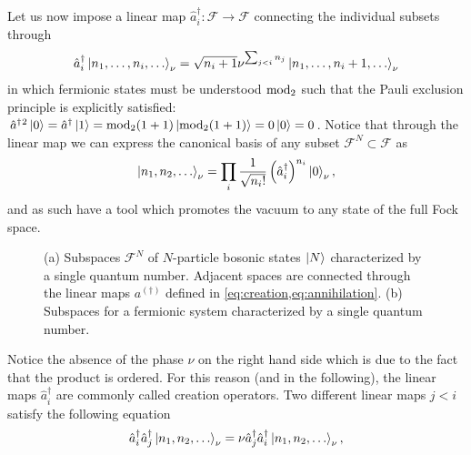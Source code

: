 \documentclass{svmono}
\def\FS{\mathcal{F}}
\begin{document}
Let us now impose a linear map $\hat a^\dag_i:\FS\rightarrow\FS$ connecting the individual subsets through
\begin{align}
    \hat a^\dag_i\ket{n_1,\dots,n_i,\dots}_\nu = \sqrt{n_i+1}\nu^{\sum_{j<i}n_j}\ket{n_1,\dots,n_i+1,\dots}_\nu
    \label{eq:creation}
\end{align}
in which fermionic states must be understood ${\rm mod}_2$ such that the Pauli exclusion principle is explicitly satisfied: $\hat a^\dag{}^2\ket{0}=\hat a^\dag\ket{1}={\rm mod}_2(1+1)\ket{{\rm mod}_2(1+1)} = 0\ket{0} = 0$.
Notice that through the linear map we can express the canonical basis of any subset $\FS^N\subset\FS$ as
\begin{align}
    \ket{n_1,n_2,\dots}_\nu = \prod_i\frac1{\sqrt{n_i!}}\left(\hat a^\dag_i\right)^{n_i}\ket{0}_\nu,
    \label{eq:Fock_basis}
\end{align}
and as such have a tool which promotes the vacuum to any state of the full Fock space.
\begin{figure}
    \centering
    \hfil
    \caption{(a) Subspaces $\FS^N$ of $N$-particle bosonic states $\ket{N}$ characterized by a single quantum number. Adjacent spaces are connected through the linear maps $a^{(\dag)}$ defined in \cref{eq:creation,eq:annihilation}. (b) Subspaces for a fermionic system characterized by a single quantum number.}
    \label{fig:fock_spaces}
\end{figure}
Notice the absence of the phase $\nu$ on the right hand side which is due to the fact that the product is ordered.
For this reason (and in the following), the linear maps $\hat a^\dag_i$ are commonly called creation operators.
Two different linear maps $j<i$ satisfy the following equation
\begin{align}
    \hat a^\dag_i \hat a^\dag_j\ket{n_1,n_2,\dots}_\nu = \nu \hat a^\dag_j\hat a^\dag_i\ket{n_1,n_2,\dots}_\nu,
\end{align}
\end{document}
